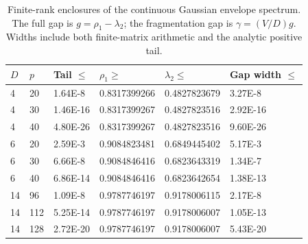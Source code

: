 \begin{table}[htbp]
\centering
\caption{Finite-rank enclosures of the continuous Gaussian envelope spectrum. The full gap is $g=\rho_1-\lambda_2$; the fragmentation gap is $\gamma=(V/D)g$. Widths include both finite-matrix arithmetic and the analytic positive tail.}
\label{tab:gaussian_rank}
\begin{tabular}{llllll}
\toprule
$D$ & $p$ & Tail $\leq$ & $\rho_1\geq$ & $\lambda_2\leq$ & Gap width $\leq$ \\
\midrule
4 & 20 & 1.64E-8 & 0.8317399266 & 0.4827823679 & 3.27E-8 \\
4 & 30 & 1.46E-16 & 0.8317399267 & 0.4827823516 & 2.92E-16 \\
4 & 40 & 4.80E-26 & 0.8317399267 & 0.4827823516 & 9.60E-26 \\
6 & 20 & 2.59E-3 & 0.9084823481 & 0.6849445402 & 5.17E-3 \\
6 & 30 & 6.66E-8 & 0.9084846416 & 0.6823643319 & 1.34E-7 \\
6 & 40 & 6.86E-14 & 0.9084846416 & 0.6823642654 & 1.38E-13 \\
14 & 96 & 1.09E-8 & 0.9787746197 & 0.9178006115 & 2.17E-8 \\
14 & 112 & 5.25E-14 & 0.9787746197 & 0.9178006007 & 1.05E-13 \\
14 & 128 & 2.72E-20 & 0.9787746197 & 0.9178006007 & 5.43E-20 \\
\bottomrule
\end{tabular}
\end{table}
